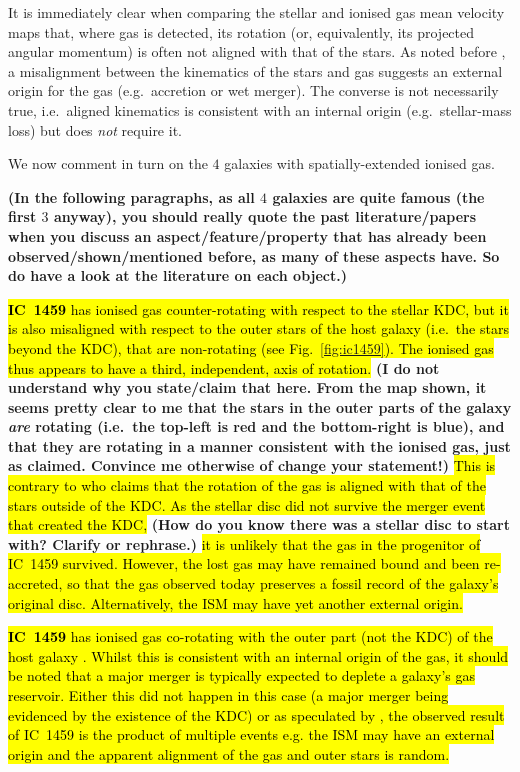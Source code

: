 \documentclass[a4paper,fleqn,usenatbib]{mnras}
\DeclareRobustCommand{\removed}[1]{{\sethlcolor{red}\hl{#1}}}
\DeclareRobustCommand{\added}[1]{{\sethlcolor{green}\hl{#1}}}
\begin{document}
It is immediately clear when comparing the stellar and ionised gas
mean velocity maps that, where gas is detected, its rotation (or,
equivalently, its projected angular momentum) is often not aligned
with that of the stars. As noted before \citep[e.g.][]{Davis2011a}, a
misalignment between the kinematics of the stars and gas suggests an
external origin for the gas (e.g.\ accretion or wet merger). The
converse is not necessarily true, i.e.\ aligned kinematics is
consistent with an internal origin (e.g.\ stellar-mass loss) but does
\emph{not} require it.

We now comment in turn on the $4$ galaxies with spatially-extended
ionised gas.

{\bf (In the following paragraphs, as all $4$ galaxies are quite
  famous (the first $3$ anyway), you should really quote the past
  literature/papers when you discuss an aspect/feature/property that
  has already been observed/shown/mentioned before, as many of these
  aspects have. So do have a look at the literature on each object.)}

\removed{\textbf{IC~1459} has ionised gas counter-rotating with respect to the
stellar KDC, but it is also misaligned with respect to the outer stars
of the host galaxy (i.e.\ the stars beyond the KDC), that are
non-rotating (see Fig.~\ref{fig:ic1459}). The ionised gas thus appears
to have a third, independent, axis of rotation.} {\bf (I do not
  understand why you state/claim that here. From the map shown, it
  seems pretty clear to me that the stars in the outer parts of the
  galaxy {\em are} rotating (i.e.\ the top-left is red and the
  bottom-right is blue), and that they are rotating in a manner
  consistent with the ionised gas, just as \citet{Franx1988}
  claimed. Convince me otherwise of change your statement!)} \removed{This is
contrary to \citet{Franx1988} who claims that the rotation of the gas
is aligned with that of the stars outside of the KDC. As the stellar
disc did not survive the merger event that created the KDC, }{\bf (How
  do you know there was a stellar disc to start with? Clarify or
  rephrase.)} \removed{it is unlikely that the gas in the progenitor of IC~1459
survived. However, the lost gas may have remained bound and been
re-accreted, so that the gas observed today preserves a fossil record
of the galaxy's original disc. Alternatively, the ISM may have yet
another external origin.}

\added{\textbf{IC~1459} has ionised gas co-rotating with the outer part (not the KDC) of the host galaxy \citep{Franx1988}. Whilst this is consistent with an internal origin of the gas, it should be noted that a major merger is typically expected to deplete a galaxy's gas reservoir. Either this did not happen in this case (a major merger being evidenced by the existence of the KDC) or as speculated by \citet{Prichard2019}, the observed result of IC~1459 is the product of multiple events e.g. the ISM may have an external origin and the apparent alignment of the gas and outer stars is random.}
\end{document}
